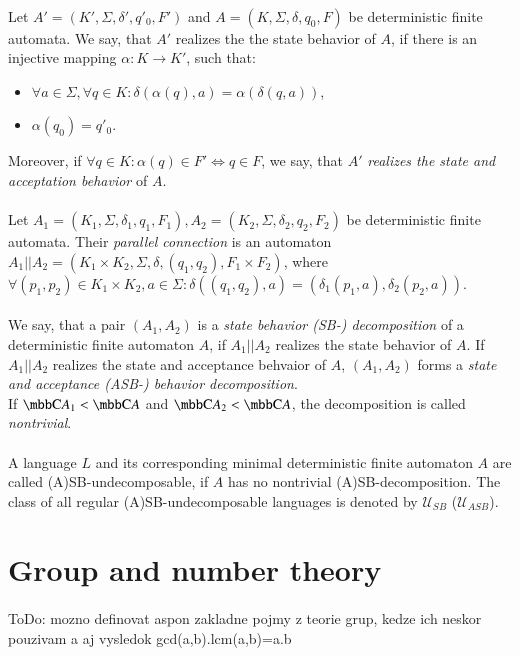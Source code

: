 \paragraph{}
 Let $A'=(K', \Sigma, \delta', q'_0, F')$ and $A=(K, \Sigma, \delta, q_0, F)$ be deterministic finite automata. We say, that $A'$ realizes the the state behavior of $A$, if there is an injective mapping $\alpha: K \rightarrow K'$, such that:

\begin{itemize}
\item $\forall a \in \Sigma, \forall q \in K: \delta(\alpha(q), a) = \alpha(\delta(q, a))$,
\item $\alpha(q_0) = q'_0$.
\end{itemize}

Moreover, if $\forall q \in K: \alpha(q)\in F' \Leftrightarrow q \in F$, we say, that $A'$ \emph{realizes the state and acceptation behavior} of $A$.

\paragraph{}
 Let $A_1=(K_1, \Sigma, \delta_1, q_1, F_1), A_2=(K_2, \Sigma, \delta_2, q_2, F_2)$ be deterministic finite automata. Their \emph{parallel connection} is an automaton $A_1 || A_2 = (K_1\times K_2, \Sigma, \delta, (q_1,q_2), F_1\times F_2)$, where $\forall (p_1,p_2) \in K_1\times K_2, a \in \Sigma: \delta((q_1,q_2), a) = (\delta_1(p_1, a), \delta_2(p_2,a))$.

\paragraph{}
 We say, that a pair $(A_1, A_2)$ is a \emph{state behavior (SB-) decomposition} of a deterministic finite automaton $A$, if $A_1 || A_2$ realizes the state behavior of $A$. If $A_1 || A_2$ realizes the state and acceptance behvaior of $A$, $(A_1,A_2)$ forms a \emph{state and acceptance (ASB-) behavior decomposition}.\\
If $\C{A_1} < \C{A}$ and $\C{A_2} < \C{A}$, the decomposition is called \emph{nontrivial}.

\paragraph{}
 A language $L$ and its corresponding minimal deterministic finite automaton $A$ are called (A)SB-undecomposable, if $A$ has no nontrivial (A)SB-decomposition. The class of all regular (A)SB-undecomposable languages is denoted by $\mathcal{U}_{SB}$ ($\mathcal{U}_{ASB}$).

\section{Group and number theory}
\paragraph{}
\color{red}ToDo: mozno definovat aspon zakladne pojmy z teorie grup, kedze ich neskor pouzivam a aj vysledok gcd(a,b).lcm(a,b)=a.b\color{black}

\paragraph{}
